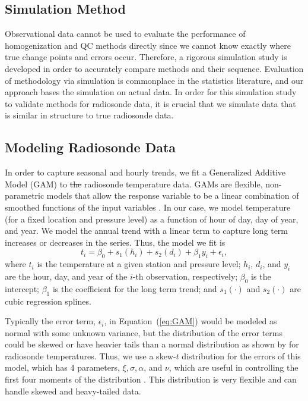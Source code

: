 \documentclass[12pt]{article}
\def\ni{\noindent}
\providecommand{\DIFaddtex}[1]{{\protect\color{blue}\uwave{#1}}} %
\providecommand{\DIFdeltex}[1]{{\protect\color{red}\sout{#1}}}                      %
\providecommand{\DIFaddbegin}{} %
\providecommand{\DIFaddend}{} %
\providecommand{\DIFdelbegin}{} %
\providecommand{\DIFdelend}{} %
\providecommand{\DIFadd}[1]{\texorpdfstring{\DIFaddtex{#1}}{#1}} %
\providecommand{\DIFdel}[1]{\texorpdfstring{\DIFdeltex{#1}}{}} %
\begin{document}
\begin{doublespacing}
\section{Simulation Method}
Observational data cannot be used to evaluate the performance of  homogenization and QC methods directly since we cannot know exactly where true change points and \DIFaddbegin \DIFadd{random }\DIFaddend errors occur.  Therefore, a rigorous simulation study is developed in order to accurately compare methods and their sequence.  Evaluation of methodology via simulation is commonplace in the statistics literature, and our approach bases the simulation on actual data.  In order for this simulation study to validate methods for radiosonde data, it is crucial that we simulate data that is similar in structure to true radiosonde data.

\subsection{Modeling Radiosonde Data}
\label{ssec:model}

In order to capture seasonal and hourly trends, we fit a Generalized Additive Model (GAM) to  \DIFdelbegin \DIFdel{the }\DIFdelend radiosonde temperature data.  GAMs are flexible, non-parametric models that allow the response variable to be a linear combination of smoothed functions of the input variables \cite{hastie90}.  In our case, we model temperature (for a fixed location and pressure level) as a function of hour of day, day of year, and year.  We model the annual trend with a linear term to capture long term increases or decreases in the series.  Thus, the model we fit is
\begin{equation} \label{eq:GAM}
	t_i = \beta_0 + s_1(h_i) + s_2(d_i) + \beta_1 y_i + \epsilon_i,
\end{equation}
\ni where $t_i$ is the temperature at a given station and pressure level; $h_i$, $d_i$, and $y_i$ are the hour, day, and year of the $i$-th observation, respectively; $\beta_0$ is the intercept; $\beta_1$ is the coefficient for the long term trend; and $s_1(\cdot)$ and $s_2(\cdot)$ are cubic regression splines.

Typically the error term, $\epsilon_i$, in Equation~(\ref{eq:GAM}) would be modeled as normal with some unknown variance, but the distribution of the error terms could be skewed or have heavier tails than a normal distribution as shown by \cite{bell14} for radiosonde temperatures.  Thus, we use a skew-$t$ distribution for the errors of this model, which has 4 parameters, $\xi, \sigma, \alpha$, and $\nu$, which are useful in controlling the first four moments of the distribution \cite{azzalini03}.  This distribution is very flexible and can handle skewed and heavy-tailed data.


\end{doublespacing}
\end{document}
